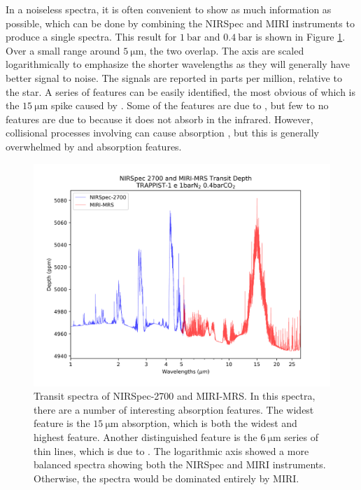 In a noiseless spectra, it is often convenient to show as much information as
 possible, which can be done by combining the NIRSpec and MIRI instruments to
 produce a single spectra. This result for $\SI{1}{\bar}$  and
 $\SI{0.4}{\bar}$ 
 is shown in Figure \ref{nirspecmiri}. Over a small range around
 $\SI{5}{\micro\meter}$, the two overlap. The axis are scaled logarithmically to
 emphasize the shorter wavelengths as they will generally have better signal to
 noise. The signals are reported in parts per million, relative to the star. A
 series of features can be easily identified, the most obvious of which
 is the $\SI{15}{\micro\meter}$ spike caused by . Some of the features
 are due to , but few to no features are due to  because
 it does not absorb in the infrared. However, collisional processes involving
  can cause absorption \citep{badhan19}, but this is generally
 overwhelmed by  and  absorption features.

\begin{figure}[ht]
    \begin{center}
        \includegraphics[width=\textwidth]{spectra/miri_nirspec_depth.png}
        \caption[Transit spectra of NIRSpec-2700 and MIRI-MRS]{Transit spectra
         of NIRSpec-2700 and MIRI-MRS. In this spectra, there are a number of
         interesting absorption features. The widest feature is the $\SI{15}{\micro\meter}$
          absorption, which is both the widest and highest feature.
         Another distinguished feature is the $\SI{6}{\micro\meter}$ series of thin lines, which
         is due to . The logarithmic axis showed a more balanced
         spectra showing both the NIRSpec and MIRI instruments. Otherwise, the
         spectra would be dominated entirely by MIRI.}
        \label{nirspecmiri}
    \end{center}
\end{figure}

